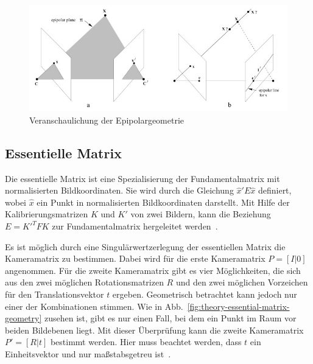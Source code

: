 \begin{figure}[h!]
    \centering
    \includegraphics[width=\textwidth]{src/img/hartley_2003_fundamental_matrix.jpg}
    \caption{Veranschaulichung der Epipolargeometrie~\cite[Fig. 9.1]{hartley_2003}}
    \label{fig:theory-fundamental-matrix}
\end{figure}

\subsection{Essentielle Matrix}
Die essentielle Matrix ist eine Spezialisierung der Fundamentalmatrix mit normalisierten Bildkoordinaten.
Sie wird durch die Gleichung $\hat{x}'E\hat{x}$ definiert, wobei $\hat{x}$ ein Punkt in normalisierten Bildkoordinaten darstellt.
Mit Hilfe der Kalibrierungsmatrizen $K$ und $K'$ von zwei Bildern, kann die Beziehung $E=K'^TFK$ zur Fundamentalmatrix hergeleitet werden~\cite[Kapitel 9.6]{hartley_2003}.

Es ist möglich durch eine Singulärwertzerlegung der essentiellen Matrix die Kameramatrix zu bestimmen.
Dabei wird für die erste Kameramatrix $P=[I|0]$ angenommen. 
Für die zweite Kameramatrix gibt es vier Möglichkeiten, die sich aus den zwei möglichen Rotationsmatrizen $R$ und den zwei möglichen Vorzeichen für den Translationsvektor $t$ ergeben.
Geometrisch betrachtet kann jedoch nur einer der Kombinationen stimmen.
Wie in Abb.~\ref{fig:theory-essential-matrix-geometry} zusehen ist, gibt es nur einen Fall, bei dem ein Punkt im Raum vor beiden Bildebenen liegt.
Mit dieser Überprüfung kann die zweite Kameramatrix $P'=[R|t]$ bestimmt werden.
Hier muss beachtet werden, dass $t$ ein Einheitsvektor und nur maßstabsgetreu ist~\cite[Kapitel 9.6.3]{hartley_2003}.


